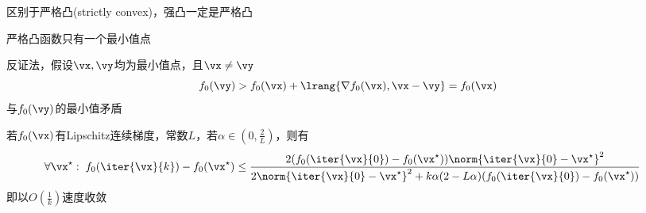 区别于严格凸(strictly convex)，强凸一定是严格凸

\begin{theorem}
    严格凸函数只有一个最小值点
\end{theorem}
\begin{analysis}
    反证法，假设$\vx,\vy$均为最小值点，且$\vx\ne \vy$
    \[f_0(\vy)>f_0(\vx)+\lrang{\nabla f_0(\vx),\vx-\vy}=f_0(\vx)\]
    与$f_0(\vy)$的最小值矛盾
\end{analysis}

\begin{theorem}
    若$f_0(\vx)$有Lipschitz连续梯度，常数$L$，若$\alpha\in(0,\frac{2}{L})$，则有
    \[\begin{aligned}
        \forall \vx^\star:\;f_0(\iter{\vx}{k})-f_0(\vx^\star)&\leq \frac{2(f_0(\iter{\vx}{0})-f_0(\vx^\star))\norm{\iter{\vx}{0}-\vx^\star}^2}
        {2\norm{\iter{\vx}{0}-\vx^\star}^2+k\alpha(2-L\alpha)(f_0(\iter{\vx}{0})-f_0(\vx^\star))}
    \end{aligned}\]
    即以$O(\frac{1}{k})$速度收敛
\end{theorem}
